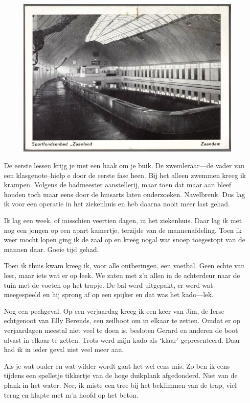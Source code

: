 \documentclass[10pt,twoside, openright]{memoir}
\begin{document}
\begin{figure}
\includegraphics[width=\textwidth]{img/77sportfondsenbad}
\end{figure}

De eerste lessen krijg je met een haak om je buik. De zwemleraar---de vader van een klasgenote--hielp e door de eerste fase heen. Bij het alleen zwemmen kreeg ik krampen. Volgens de badmeester aanstellerij, maar toen dat maar aan bleef houden toch maar eens door de huisarts laten onderzoeken. Navelbreuk. Dus lag ik voor een operatie in het ziekenhuis en heb daarna nooit meer last gehad.

Ik lag een week, of misschien veertien dagen, in het ziekenhuis. Daar lag ik met nog een jongen op een apart kamertje, terzijde van de mannenafdeling. Toen ik weer mocht lopen ging ik de zaal op en kreeg nogal wat snoep toegestopt van de mannen daar. Goeie tijd gehad.

Toen ik thuis kwam kreeg ik, voor alle ontberingen, een voetbal. Geen echte van leer, maar iets wat er op leek. We zaten met z’n allen in de achterdeur naar de tuin met de voeten op het trapje. De bal werd uitgepakt, er werd wat meegespeeld en hij sprong af op een spijker en dat was het kado---lek. 

Nog een pechgeval. Op een verjaardag kreeg ik een keer van Jim, de Ierse echtgenoot van Elly Berends, een zeilboot om in elkaar te zetten. Omdat er op verjaardagen meestal niet veel te doen is, besloten Gerard en anderen de boot alvast in elkaar te zetten. Trots werd mijn kado als ‘klaar’ gepresenteerd. Daar had ik in ieder geval niet veel meer aan.

Als je wat ouder en wat wilder wordt gaat het wel eens mis. Zo ben ik eens tijdens een spelletje tikkertje van de hoge duikplank afgedonderd. Niet van de plank in het water. Nee, ik miste een tree bij het beklimmen van de trap, viel terug en klapte met m’n hoofd op het beton. 
\end{document}
